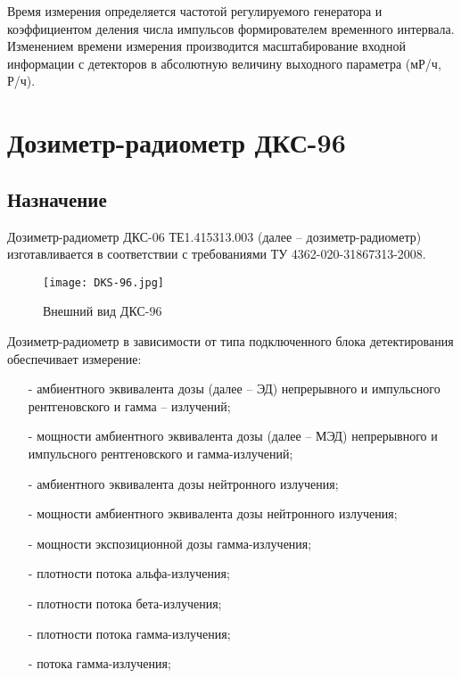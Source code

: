     Время измерения определяется частотой регулируемого генератора и 
    коэффициентом деления числа импульсов формирователем временного интервала. 
    Изменением времени измерения производится масштабирование входной 
    информации с детекторов в абсолютную величину выходного параметра 
    (мР/ч, Р/ч).

\clearpage

\section{Дозиметр-радиометр ДКС-96} \label{sect2_2}
\subsection{Назначение} \label{subsect2_2_1}
    Дозиметр-радиометр ДКС-06 ТЕ1.415313.003 (далее -- дозиметр-радиометр) 
    изготавливается в соответствии с требованиями ТУ 4362-020-31867313-2008. 

    \begin{figure}[ht]
		\centering
		\texttt{[image: DKS-96.jpg]}
		\caption{Внешний вид ДКС-96}
	\end{figure}

    Дозиметр-радиометр в зависимости от типа подключенного блока детектирования 
    обеспечивает измерение:
    \begin{itemize}
    	\item[-] амбиентного эквивалента дозы (далее -- ЭД) непрерывного и 
    		импульсного рентгеновского и гамма -- излучений;
    	\item[-] мощности амбиентного эквивалента дозы (далее -- МЭД)
    		непрерывного и импульсного рентгеновского и гамма-излучений;
    	\item[-] амбиентного эквивалента дозы нейтронного излучения;
    	\item[-] мощности амбиентного эквивалента дозы нейтронного излучения;
    	\item[-] мощности экспозиционной дозы гамма-излучения;
    	\item[-] плотности потока альфа-излучения;
    	\item[-] плотности потока бета-излучения;
    	\item[-] плотности потока гамма-излучения;
    	\item[-] потока гамма-излучения;
    \end{itemize}

